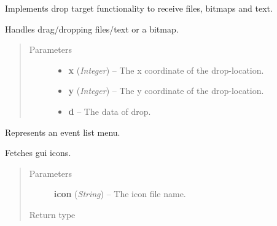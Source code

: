 \documentclass[letterpaper,10pt,english]{sphinxmanual}
\begin{document}

\begin{fulllineitems}
\label{graphicaldesign:graphicaldesign.DropTarget}
Implements drop target functionality to receive files, bitmaps and text.

\begin{fulllineitems}
\label{graphicaldesign:graphicaldesign.DropTarget.OnData}
Handles drag/dropping files/text or a bitmap.
\begin{quote}\begin{description}
\item[{Parameters}] \leavevmode\begin{itemize}
\item {} 
\textbf{x} (\emph{Integer}) -- The x coordinate of the drop-location.

\item {} 
\textbf{y} (\emph{Integer}) -- The y coordinate of the drop-location.

\item {} 
\textbf{d} -- The data of drop.

\end{itemize}

\end{description}\end{quote}

\end{fulllineitems}


\end{fulllineitems}


\begin{fulllineitems}
\label{graphicaldesign:graphicaldesign.EventListTemplate}
Represents an event list menu.

\begin{fulllineitems}
\label{graphicaldesign:graphicaldesign.EventListTemplate.GetProgramIcon}
Fetches gui icons.
\begin{quote}\begin{description}
\item[{Parameters}] \leavevmode
\textbf{icon} (\emph{String}) -- The icon file name.

\item[{Return type}] \leavevmode
{}

\end{description}\end{quote}

\end{fulllineitems}


\end{fulllineitems}
\end{document}
